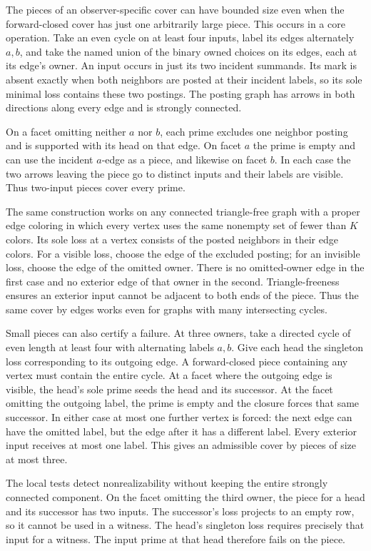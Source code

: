 The pieces of an observer-specific cover can
have bounded size even when the forward-closed
cover has just one arbitrarily large piece.
This occurs in a core operation. Take an even
cycle on at least four inputs, label its
edges alternately $a,b$, and take the named
union of the binary owned choices on its
edges, each at its edge's owner. An input
occurs in just its two incident summands.
Its mark is absent exactly when both
neighbors are posted at their incident
labels, so its sole minimal loss contains
these two postings. The posting graph
has arrows in both directions along every
edge and is strongly connected.

On a facet omitting neither $a$ nor $b$,
each prime excludes one neighbor posting
and is supported with its head on that
edge. On facet $a$ the prime is empty
and can use the incident $a$-edge as a
piece, and likewise on facet $b$.
In each case the two arrows leaving
the piece go to distinct inputs and
their labels are visible. Thus two-input
pieces cover every prime.

The same construction works on any connected
triangle-free graph with a proper edge coloring
in which every vertex uses the same nonempty
set of fewer than $K$ colors. Its sole loss at a vertex consists
of the posted neighbors in their edge colors.
For a visible loss, choose the edge of the
excluded posting; for an invisible loss,
choose the edge of the omitted owner.
There is no omitted-owner edge in the first
case and no exterior edge of that owner in
the second.
Triangle-freeness ensures an exterior input
cannot be adjacent to both ends of the piece.
Thus the same cover by edges works even for
graphs with many intersecting cycles.

Small pieces can also certify a failure.
At three owners, take a directed cycle of even
length at least four with alternating labels
$a,b$. Give each head the singleton loss
corresponding to its outgoing edge. A
forward-closed piece containing any vertex
must contain the entire cycle. At a facet
where the outgoing edge is visible, the
head's sole prime seeds the head and its
successor. At the facet omitting the outgoing
label, the prime is empty and the closure
forces that same successor. In either case
at most one further vertex is forced:
the next edge can have the omitted label,
but the edge after it has a different
label. Every exterior input receives at
most one label. This gives an admissible
cover by pieces of size at most three.

The local tests detect nonrealizability
without keeping the entire strongly
connected component. On the facet omitting
the third owner, the piece for a head and
its successor has two inputs. The
successor's loss projects to an empty row,
so it cannot be used in a witness. The
head's singleton loss requires precisely
that input for a witness. The input prime
at that head therefore fails on the piece.

